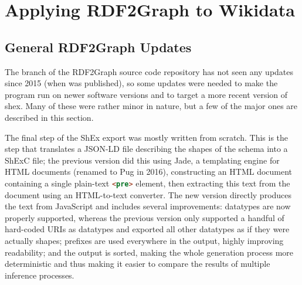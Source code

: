 
\chapter{Applying RDF2Graph to Wikidata}
\label{ch:RDF2Graph+Wikidata}

\section{General RDF2Graph Updates}
\label{sec:RDF2Graph+Wikidata:updates}

The  branch of the RDF2Graph source code repository
has not seen any updates since 2015 (when \cite{vanDam2015} was published), %
so some updates were needed to make the program run on newer software versions
and to target a more recent version of \gls{shex}.
Many of these were rather minor in nature,
but a few of the major ones are described in this section.

The final step of the ShEx export was mostly written from scratch.
This is the step that translates a JSON-LD file describing the shapes of the schema
into a ShExC file;
the previous version did this using Jade,
a templating engine for HTML documents (renamed to Pug in 2016),
constructing an HTML document containing a single plain-text \lstinline[language=html]{<pre>} element,
then extracting this text from the document using an HTML-to-text converter.
The new version directly produces the text from JavaScript
and includes several improvements:
datatypes are now properly supported,
whereas the previous version only supported a handful of hard-coded URIs as datatypes
and exported all other datatypes as if they were actually shapes;
prefixes are used everywhere in the output, highly improving readability;
and the output is sorted, making the whole generation process more deterministic
and thus making it easier to compare the results of multiple inference processes.

